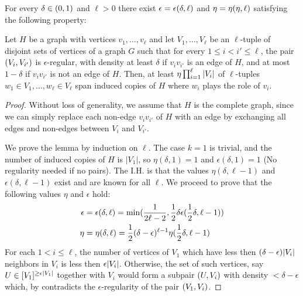     \begin{lemma} \label{lem:H_like_partition_implies_H_abundance}
        For every $\delta \in ( 0, 1 )$ and $\ell > 0$ there exist $\epsilon = \epsilon ( \delta, \ell )$ and
        $\eta = \eta ( \eta, \ell )$ satisfying the following property:

        Let $H$ be a graph with vertices $v_1, \dots,v_\ell$ and let $V_1, \dots, V_\ell$ be an $\ell$-tuple of disjoint
        sets of vertices of a graph $G$ such that for every $1 \leq i < i' \leq \ell$, the pair $( V_i, V_{i'} )$
        is $\epsilon$-regular, with density at least $\delta$ if $v_i v_{i'}$ is an edge of $H$, and at most $1 - \delta$
        if $v_i v_{i'}$ is not an edge of $H$.
        Then, at least $\eta \prod_{i=1}^\ell | V_i |$ of $\ell$-tuples $w_1 \in V_1, \dots, w_\ell \in V_\ell$
        span induced copies of $H$ where $w_i$ plays the role of $v_i$.
        \begin{proof}
            Without loss of generality, we assume that $H$ is the complete graph, since we can simply replace each non-edge
            $v_i v_{i'}$ of $H$ with an edge by exchanging all edges and non-edges between $V_i$ and $V_{i'}$.

            We prove the lemma by induction on $\ell$.
            The case $k=1$ is trivial, and the number of induced copies of $H$ is $|V_1|$, so $\eta(\delta, 1) = 1$ and
            $\epsilon(\delta, 1) = 1$ (No regularity needed if no pairs).
            The I.H. is that the values $\eta(\delta, \ell-1)$ and $\epsilon(\delta, \ell-1)$ exist and are known for all
            $\ell$.
            We proceed to prove that the following values $\eta$ and $\epsilon$ hold:
            \begin{align*}
                \epsilon &= \epsilon(\delta, \ell)
                    = \min ( \frac{1}{2\ell - 2}, \frac{1}{2} \delta \epsilon(\frac{1}{2}\delta, \ell-1) ) \\
                \eta &= \eta(\delta, \ell)
                    = \frac{1}{2} (\delta - \epsilon)^{\ell-1} \eta(\frac{1}{2}\delta, \ell-1)
            \end{align*}
            For each $1 < i \leq \ell$, the number of vertices of $V_1$ which have less then
            $(\delta - \epsilon) | V_i |$ neighbors in $V_i$ is less then $\epsilon | V_i |$.
            Otherwise, the set of such vertices, say $U \in [V_1]^{\geq \epsilon | V_1 |}$ together with $V_i$
            would form a subpair $( U, V_i )$ with density $< \delta - \epsilon$ which, by
             contradicts the $\epsilon$-regularity of the pair $( V_1, V_i )$.


\end{proof}
\end{lemma}
